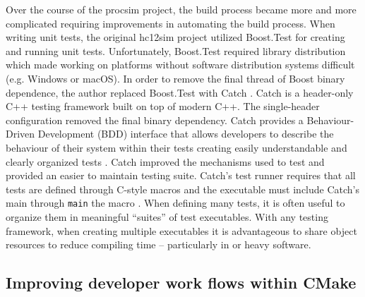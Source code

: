 Over the course of the procsim project, the build process became more and more complicated requiring improvements in automating the build process. When writing unit tests, the original hc12sim project utilized Boost.Test \cite{Boost1.53.0:Test} for creating and running unit tests. Unfortunately, Boost.Test required library distribution which made working on platforms without software distribution systems difficult (e.g. Windows or macOS). In order to remove the final thread of Boost binary dependence, the author replaced Boost.Test with Catch \cite{CatchLib}. Catch is a header-only C++ testing framework built on top of modern C++. The single-header configuration removed the final binary dependency. Catch provides a Behaviour-Driven Development (BDD) interface that allows developers to describe the behaviour of their system within their tests creating easily understandable and clearly organized tests \cite{Solis2011}. Catch improved the mechanisms used to test and provided an easier to maintain testing suite. Catch's test runner requires that all tests are defined through C-style macros and the executable must include Catch's main through \verb|main| the  macro \cite{CatchLib:Tutorial}. When defining many tests, it is often useful to organize them in meaningful ``suites'' of test executables. With any testing framework, when creating multiple executables it is advantageous to share object resources to reduce compiling time -- particularly in  or  heavy software.

\subsection{Improving developer work flows within CMake}

